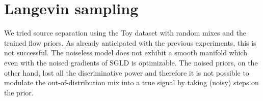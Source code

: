 \section{Langevin sampling}
We tried source separation using the Toy dataset with random mixes and the trained flow priors. As already anticipated with the previous experiments, this is not successful. The noiseless model does not exhibit a smooth manifold which even with the noised gradients of SGLD is optimizable. The noised priors, on the other hand, lost all the discriminative power and therefore it is not possible to modulate the out-of-distribution mix into a true signal by taking (noisy) steps on the prior.
